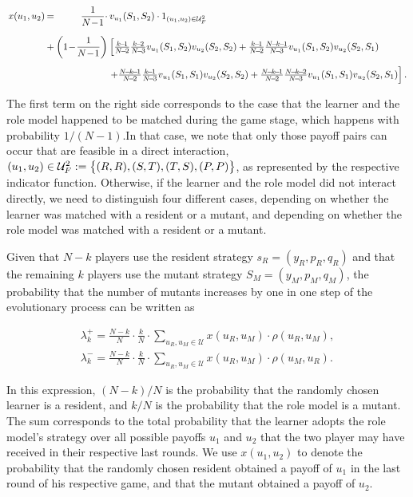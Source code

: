 \documentclass[11pt]{article}
\newcommand{\splitatcommas}[1]{%
  \begingroup
  \begingroup\lccode`~=`, \lowercase{\endgroup
    \edef~{\mathchar\the\mathcode`, \penalty0 \noexpand\hspace{0pt plus 1em}}%
  }\mathcode`,="8000 #1%
  \endgroup
}
\theoremstyle{plainCl1}
\theoremstyle{plainCl2}
\begin{document}
\begin{equation}\label{eq:Chi}
\setlength{\arraycolsep}{1pt}
\begin{array}{llrl}
x(u_1,u_2)	 &=&\displaystyle \frac{1}{N\!-\!1}\cdot  &v_{u_1}(S_1,S_2)\cdot 1_{(u_1,u_2)\in \mathcal{U}^2_F}\\[0.5cm]
&+	
&\displaystyle \left(1\!-\!\frac{1}{N\!-\!1}\right)  
&\left[ \frac{k\!-\!1}{N\!-\!2}\frac{k\!-\!2}{N\!-\!3} v_{u_1}(S_1,S_2) v_{u_2}(S_2,S_2) + 
 \frac{k\!-\!1}{N\!-\!2}\frac{N\!-\!k\!-\!1}{N\!-\!3} v_{u_1}(S_1,S_2) v_{u_2}(S_2,S_1)\right.\\[0.5cm]
&&&\left. +\frac{N\!-\!k\!-\!1}{N\!-\!2}\frac{k\!-\!1}{N\!-\!3} v_{u_1}(S_1,S_1) v_{u_2}(S_2,S_2) + 
 \frac{N\!-\!k\!-\!1}{N\!-\!2}\frac{N\!-\!k\!-\!2}{N\!-\!3} v_{u_1}(S_1,S_1) v_{u_2}(S_2,S_1)\right].
\end{array}
\end{equation}

The first term on the right side corresponds to the case that the learner and
the role model happened to be matched during the game stage, which happens with
probability $1/(N\!-\!1)$.In that case, we note that only those payoff pairs
can occur that are feasible in a direct interaction, $\splitatcommas{(u_1,u_2)\in
\mathcal{U}^2_F:=\big\{ (R,R), (S,T), (T,S), (P,P) \big\}}$, as represented by
the respective indicator function. Otherwise, if the learner and the role model
did not interact directly, we need to distinguish four different cases,
depending on whether the learner was matched with a resident or a mutant, and
depending on whether the role model was matched with a resident or a mutant.

Given that $N\!-\!k$ players use the resident strategy $s_{R}\!=\!(y_{R},p_{R},q_{R})$
and that the remaining $k$ players use the mutant strategy
$S_{M}\!=\!(y_{M},p_{M},q_{M})$, the probability that the number of mutants increases by
one in one step of the evolutionary process can be written as

\begin{align}
\lambda^+_k=\frac{N\!-\!k}{N}\cdot \frac{k}{N}\cdot \sum_{u_{R},u_{M}\in\mathcal{U}} x(u_{R},u_{M})\cdot \rho(u_{R},u_{M}), \\
\lambda^-_k=\frac{N\!-\!k}{N}\cdot \frac{k}{N}\cdot \sum_{u_{R},u_{M}\in\mathcal{U}} x(u_{R},u_{M})\cdot \rho(u_{M},u_{R}).
\end{align}

In this expression, $(N\!-\!k)/N$ is the probability that the randomly chosen
learner is a resident, and $k/N$ is the probability that the role model is a
mutant. The sum corresponds to the total probability that the learner adopts the
role model's strategy over all possible payoffs $u_1$ and $u_2$ that the two
player may have received in their respective last rounds. We use $x(u_1,u_2)$ to
denote the probability that the randomly chosen resident obtained a payoff of
$u_1$ in the last round of his respective game, and that the mutant obtained a
payoff of $u_2$.
\end{document}
